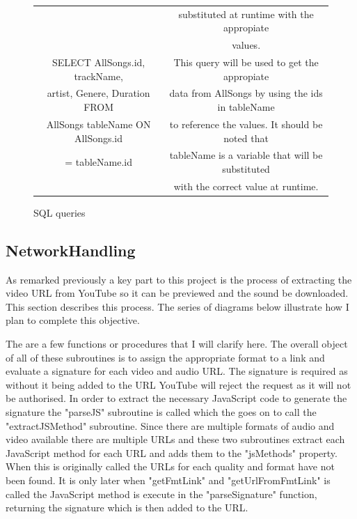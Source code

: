 \documentclass{article}
\begin{document}
\begin{figure}[H]
\begin{center}
\begin{tabular} { | c | c | }
                                             &substituted at runtime with the appropiate      \\
                                             &values.                                         \\ \hline
            SELECT AllSongs.id, trackName,   &This query will be used to get the appropiate   \\
            artist, Genere, Duration FROM    &data from AllSongs by using the ids in tableName\\
            AllSongs tableName ON AllSongs.id&to reference the values. It should be noted that\\
             = tableName.id                  &tableName is a variable that will be substituted\\
                                             &with the correct value at runtime.              \\ \hline
        \end{tabular}
    \end{center}
    \caption{SQL queries} \label{fig:SQLTable}
\end{figure}
\subsection{NetworkHandling}\label{NetworkHandling}
As remarked previously a key part to this project is the process
of extracting the video URL from YouTube so it can be previewed
and the sound be downloaded. This section describes this process.
The series of diagrams below illustrate how I plan to complete this
objective.

The are a few functions or procedures that I will clarify here. The overall
object of all of these subroutines is to assign the appropriate format to a
link and evaluate a signature for each video and audio URL. The signature is required
as without it being added to the URL YouTube will reject the request
as it will not be authorised. In order to extract the necessary JavaScript code
to generate the signature the "parseJS" subroutine is called which the goes on
to call the "extractJSMethod" subroutine. Since there are multiple formats of
audio and video available there are multiple URLs and these two subroutines extract each
JavaScript method for each URL and adds them to the "jsMethods" property. When this
is originally called the URLs for each quality and format have not been found. It is only later
when "getFmtLink" and "getUrlFromFmtLink" is called the JavaScript method is
execute in the "parseSignature" function, returning the signature which is then
added to the URL.
\end{document}

